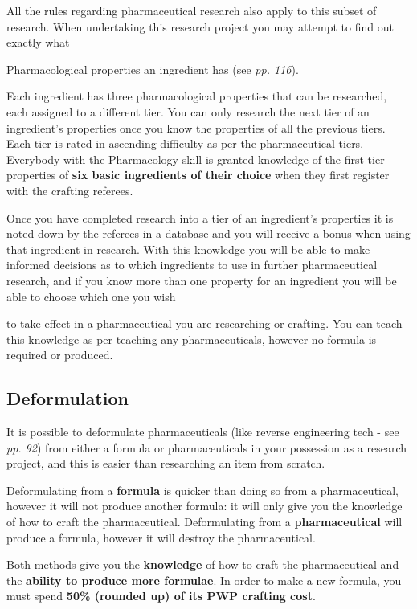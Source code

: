 All the rules regarding pharmaceutical research also apply to this subset of research. When undertaking this research project you may attempt to find out exactly what

Pharmacological properties an ingredient has (see \textit{pp. 116}).

Each ingredient has three pharmacological properties that can be researched, each assigned to a different tier. You can only research the next tier of an ingredient's properties once you know the properties of all the previous tiers. Each tier is rated in ascending difficulty as per the pharmaceutical tiers. Everybody with the Pharmacology skill is granted knowledge of the first-tier properties of \textbf{six basic ingredients of their choice} when they first register with the crafting referees.

Once you have completed research into a tier of an ingredient's properties it is noted down by the referees in a database and you will receive a bonus when using that ingredient in research. With this knowledge you will be able to make informed decisions as to which ingredients to use in further pharmaceutical research, and if you know more than one property for an ingredient you will be able to choose which one you wish

to take effect in a pharmaceutical you are researching or crafting. You can teach this knowledge as per teaching any pharmaceuticals, however no formula is required or produced.

\subsection{Deformulation}

It is possible to deformulate pharmaceuticals (like reverse engineering tech - see \textit{pp. 92}) from either a formula or pharmaceuticals in your possession as a research project, and this is easier than researching an item from scratch.

Deformulating from a \textbf{formula} is quicker than doing so from a pharmaceutical, however it will not produce another formula: it will only give you the knowledge of how to craft the pharmaceutical. Deformulating from a \textbf{pharmaceutical} will produce a formula, however it will destroy the pharmaceutical.

Both methods give you the \textbf{knowledge} of how to craft the pharmaceutical and the \textbf{ability to produce more formulae}. In order to make a new formula, you must spend \textbf{50\% (rounded up) of its PWP crafting cost}.

